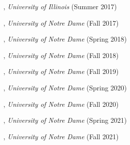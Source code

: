 \documentclass[10pt]{article}
\newenvironment{myindentpar}[1]%
{\begin{list}{}%
         {\setlength{\leftmargin}{#1}}%
         \item[]%
}
{\end{list}}
\newcounter{list}
\newcommand{\hide}[1]{}
\begin{document}
\begin{myindentpar}{0.75cm}

\hspace{-0.75cm}{\bf CS 412 Introduction to Data Mining}, \textit{University of Illinois} (Summer 2017)
	
\hspace{-0.75cm}{\bf CSE 40647/60647 Data Science}, \textit{University of Notre Dame} (Fall 2017)

\hspace{-0.75cm}{\bf CSE 40647/60647 Data Science}, \textit{University of Notre Dame} (Spring 2018)

\hspace{-0.75cm}{\bf CSE 40647/60647 Data Science}, \textit{University of Notre Dame} (Fall 2018)

\hspace{-0.75cm}{\bf CSE 40647/60647 Data Science}, \textit{University of Notre Dame} (Fall 2019)

\hspace{-0.75cm}{\bf CSE 60326 Computational Behavior Modeling}, \textit{University of Notre Dame} (Spring 2020)

\hspace{-0.75cm}{\bf CSE 40647/60647 Data Science}, \textit{University of Notre Dame} (Fall 2020)

\hspace{-0.75cm}{\bf CSE 60326 Computational Behavior Modeling}, \textit{University of Notre Dame} (Spring 2021)

\hspace{-0.75cm}{\bf CSE 40647/60647 Data Science}, \textit{University of Notre Dame} (Fall 2021)

\end{myindentpar}

\hide{
\subsection{\sc Media Coverage}
\vspace{-0.4cm} \line(1,0){370} \vspace{-0.1cm}

\begin{myindentpar}{0.75cm}
{\em With modern media, press coverage sometimes spreads far and wide. There are often more outlets reporting than can be captured. This section therefore lists only a representative article (or two) of the total press coverage.}

\hspace{-0.75cm} XXX (XXX 2019) 
\hspace{0.75cm}{\em XXX}

\hspace{-0.75cm} XXX (XXX 2019) 

\url{https://www.XXX.com/}

\end{myindentpar}
}
\end{document}
